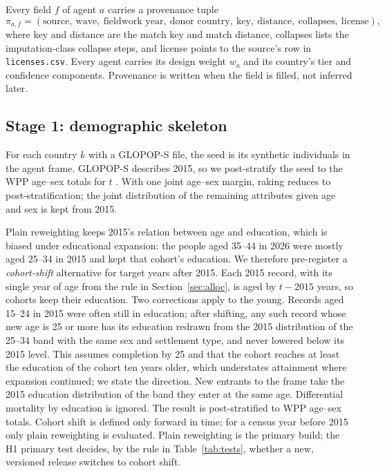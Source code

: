 \documentclass[10pt]{article}
\begin{document}
Every field $f$ of agent $a$ carries a provenance tuple
\begin{equation}
\pi_{a,f} = (\text{source},\ \text{wave},\ \text{fieldwork year},\ \text{donor country},\ \text{key},\ \text{distance},\ \text{collapses},\ \text{license}),
\end{equation}
where key and distance are the match key and match distance, collapses lists the imputation-class collapse steps, and license points to the source's row in \nolinkurl{licenses.csv}. Every agent carries its design weight $w_a$ and its country's tier and confidence components. Provenance is written when the field is filled, not inferred later.

\subsection{Stage 1: demographic skeleton}
\label{sec:stage1}

For each country $k$ with a GLOPOP-S file, the seed is its synthetic individuals in the agent frame. GLOPOP-S describes 2015, so we post-stratify the seed to the WPP age--sex totals for $t$ \citep{wpp2024}. With one joint age--sex margin, raking reduces to post-stratification; the joint distribution of the remaining attributes given age and sex is kept from 2015.

Plain reweighting keeps 2015's relation between age and education, which is biased under educational expansion: the people aged 35--44 in 2026 were mostly aged 25--34 in 2015 and kept that cohort's education. We therefore pre-register a \emph{cohort-shift} alternative for target years after 2015. Each 2015 record, with its single year of age from the rule in Section~\ref{sec:alloc}, is aged by $t - 2015$ years, so cohorts keep their education. Two corrections apply to the young. Records aged 15--24 in 2015 were often still in education; after shifting, any such record whose new age is 25 or more has its education redrawn from the 2015 distribution of the 25--34 band with the same sex and settlement type, and never lowered below its 2015 level. This assumes completion by 25 and that the cohort reaches at least the education of the cohort ten years older, which understates attainment where expansion continued; we state the direction. New entrants to the frame take the 2015 education distribution of the band they enter at the same age. Differential mortality by education is ignored. The result is post-stratified to WPP age--sex totals. Cohort shift is defined only forward in time; for a census year before 2015 only plain reweighting is evaluated. Plain reweighting is the primary build; the H1 primary test decides, by the rule in Table~\ref{tab:tests}, whether a new, versioned release switches to cohort shift.
\end{document}
